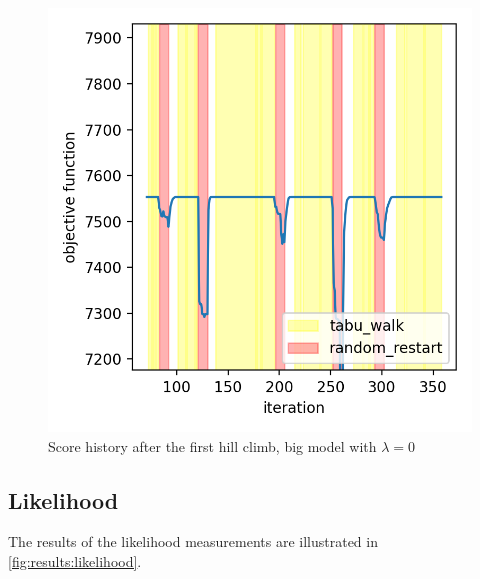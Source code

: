 \documentclass[sigconf, fleqn, prologue, dvipsnames]{acmart}
\begin{document}
\begin{figure}
	\centering
	\includegraphics[scale=0.5]{graphics/tabu_lambda_0.png}
	\caption{Score history after the first hill climb, big model with $\lambda = 0$}
	\label{fig:results:lambda_0}
\end{figure}


\subsection{Likelihood}
\label{sec:results:likelihood}
The results of the likelihood measurements are illustrated in \autoref{fig:results:likelihood}.
\end{document}
